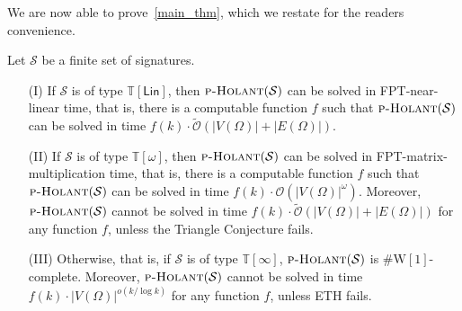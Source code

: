 \documentclass[authorcolumns,numberwithinsect]{no-lipics-v2022}
\newcommand{\W}{\mathrm{W}}
\begin{document}
We are now able to prove~\cref{main_thm}, which we restate for the readers convenience.
\begin{theorem}
    Let $\mathcal{S}$ be a finite set of signatures.
    \begin{itemize}
        \item[(I)] If $\mathcal{S}$ is of type $\mathbb{T}[\mathsf{Lin}]$, then $\textsc{p-Holant}(\mathcal{S})$ can be solved in FPT-near-linear time, that is, there is a computable function $f$ such that $\textsc{p-Holant}(\mathcal{S})$ can be solved in time $f(k)\cdot \tilde{\mathcal{O}}(|V(\Omega)|+|E(\Omega)|)$.
        \item[(II)] If $\mathcal{S}$ is of type $\mathbb{T}[\omega]$, then $\textsc{p-Holant}(\mathcal{S})$ can be solved in FPT-matrix-multiplication time, that is, there is a computable function $f$ such that $\textsc{p-Holant}(\mathcal{S})$ can be solved in time $f(k)\cdot \mathcal{O}(|V(\Omega)|^{\omega})$. Moreover, $\textsc{p-Holant}(\mathcal{S})$ cannot be solved in time $f(k)\cdot \tilde{\mathcal{O}}(|V(\Omega)|+|E(\Omega)|)$ for any function $f$, unless the Triangle Conjecture fails.
        \item[(III)] Otherwise, that is, if $\mathcal{S}$ is of type $\mathbb{T}[\infty]$, $\textsc{p-Holant}(\mathcal{S})$ is $\#\W[1]$-complete. Moreover, $\textsc{p-Holant}(\mathcal{S})$ cannot be solved in time $f(k)\cdot |V(\Omega)|^{o(k/\log k)}$ for any function $f$, unless ETH fails. 
    \end{itemize}
\end{theorem}
\end{document}
